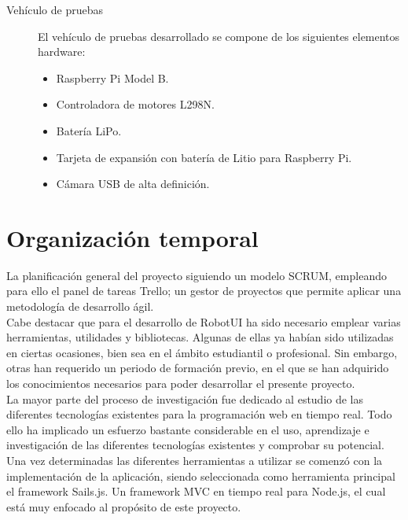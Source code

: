 \documentclass[a4paper,12pt]{article}
\begin{document}
\begin{description}
\item [Vehículo de pruebas ]

El vehículo de pruebas desarrollado se compone de los siguientes elementos hardware:\\

\begin{itemize}
\item Raspberry Pi Model B.
\item Controladora de motores L298N.
\item Batería LiPo.
\item Tarjeta de expansión con batería de Litio para Raspberry Pi.
\item Cámara USB de alta definición.
\end{itemize}

\end{description}


\section{Organización temporal}

La planificación general del proyecto siguiendo un modelo SCRUM, empleando para ello el panel de tareas Trello; un gestor de proyectos que permite aplicar una metodología de desarrollo ágil.\\

Cabe destacar que para el desarrollo de RobotUI ha sido necesario emplear varias herramientas, utilidades y bibliotecas. Algunas de ellas ya habían sido utilizadas en ciertas ocasiones, bien sea en el ámbito estudiantil o profesional. 
Sin embargo, otras han requerido un periodo de formación previo, en el que se han adquirido los conocimientos necesarios para poder desarrollar el presente proyecto.\\

La mayor parte del proceso de investigación fue dedicado al estudio de las diferentes tecnologías existentes para la programación web en tiempo real. Todo ello ha implicado un esfuerzo bastante considerable en el uso, 
aprendizaje e investigación de las diferentes tecnologías existentes y comprobar su potencial.\\

Una vez determinadas las diferentes herramientas a utilizar se comenzó con la implementación de la aplicación, siendo seleccionada como herramienta principal el framework Sails.js. Un framework MVC en 
tiempo real para Node.js, el cual está muy enfocado al propósito de este proyecto.\\
\end{document}
